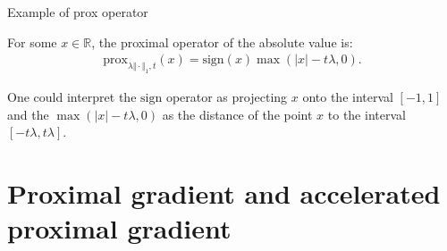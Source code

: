 \documentclass[11pt]{beamer}
\begin{document}
        \begin{frame}{Example of prox operator}
            \begin{definition}
                For some $x \in \mathbb R$, the proximal operator of the absolute value is:
                \begin{align*}
                   \text{prox}_{\lambda \Vert\cdot \Vert_1, t}(x) = \text{sign}(x)\max(|x| - t\lambda , 0). 
                \end{align*}
            \end{definition}
            One could interpret the $\text{sign}$ operator as projecting $x$ onto the interval $[-1, 1]$ and the $\max(|x| - t\lambda , 0)$ as the distance of the point $x$ to the interval $[-t\lambda, t\lambda]$. 
        \end{frame}
        
\section{Proximal gradient and accelerated proximal gradient}
\end{document}
